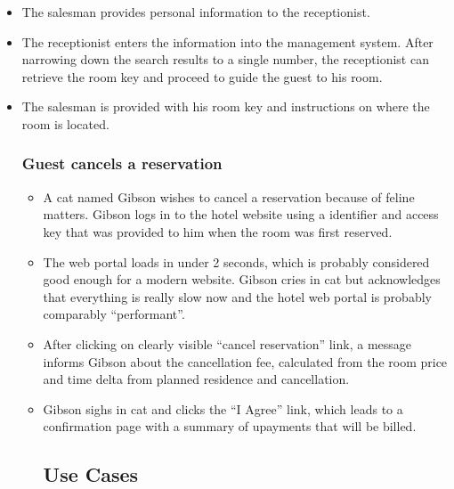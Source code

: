 \begin{itemize}
\begin{end}
\begin{itemize}
  \item The salesman provides personal information to the receptionist.
      
  \item The receptionist enters the information into the management system.
    After narrowing down the search results to a single number, the
    receptionist can retrieve the room key and proceed to guide the guest
    to his room.

  \item The salesman is provided with his room key and instructions on where
      the room is located.
\begin{end}


\subsubsection{Guest cancels a reservation}\label{scenario3}
% 
% 
% 
\begin{itemize}
  \item A cat named Gibson wishes to cancel a reservation because of feline
      matters.  Gibson logs in to the hotel website using a identifier and
        access key that was provided to him when the room was first reserved.

  \item The web portal loads in under 2 seconds, which is probably considered good
        enough for a modern website. Gibson cries in cat but acknowledges that
        everything is really slow now and the hotel web portal is probably
        comparably ``performant''.

  \item After clicking on clearly visible ``cancel reservation'' link, a
      message informs Gibson about the cancellation fee, calculated from the
        room price and time delta from planned residence and cancellation.
      
  \item Gibson sighs in cat and clicks the ``I Agree'' link, which leads to a
      confirmation page with a summary of upayments that will be billed.
\begin{end}




\subsection{Use Cases}
%
%
%


\end{end}
\end{itemize}
\end{end}
\end{itemize}
\end{end}
\end{itemize}
